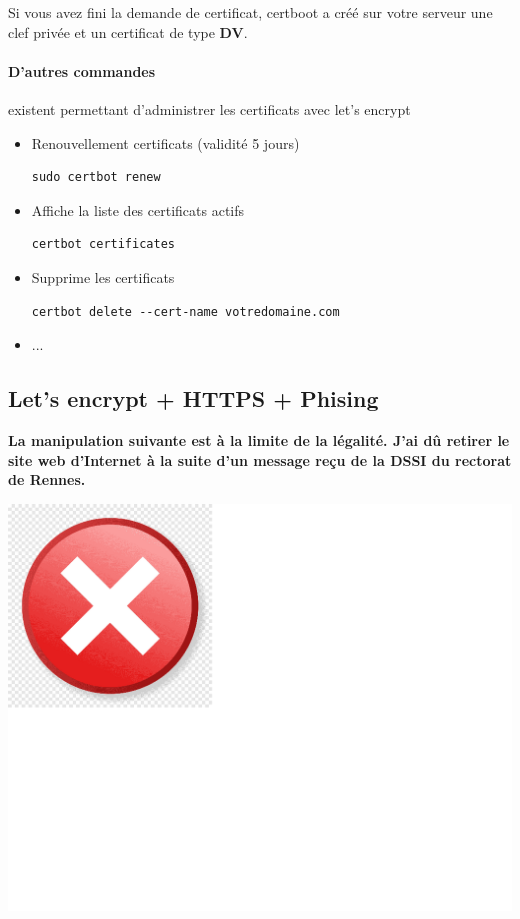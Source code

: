 \documentclass[french, 12pt]{article}%
\newcommand{\itemE}{\item[$\bullet$]}
\begin{document}
\vspace{0.5cm}
Si vous avez fini la demande de certificat, certboot a créé sur votre serveur une clef privée et un certificat de type \textbf{DV}.

\paragraph{D'autres commandes} existent permettant d'administrer les certificats avec let's encrypt 
\begin{itemize}
\itemE Renouvellement certificats (validité 5 jours)
\begin{lstlisting}[style=commande]
sudo certbot renew
\end{lstlisting}
\itemE Affiche la liste des certificats actifs 
\begin{lstlisting}[style=commande]
certbot certificates
\end{lstlisting}

\itemE Supprime les certificats
\begin{lstlisting}[style=commande]
certbot delete --cert-name votredomaine.com
\end{lstlisting}
\itemE ...
\end{itemize}


\subsection{Let's encrypt + HTTPS + Phising}


\begin{minipage}[c]{0.6\linewidth}
\textbf{La manipulation suivante est à la limite de la légalité. J'ai dû retirer le site web d'Internet à la suite d'un message reçu de la DSSI du rectorat de Rennes.}
\end{minipage}
\begin{minipage}[c]{0.4\linewidth}
\begin{center}
\includegraphics[scale=0.1]{./ressource/noOK}
\end{center}
\end{minipage}
\end{document}
